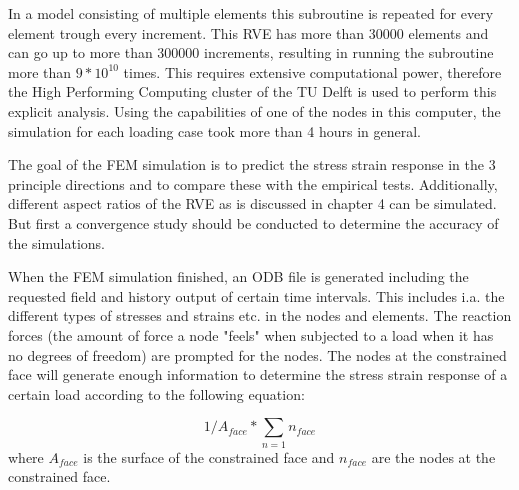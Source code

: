 In a model consisting of multiple elements this subroutine is repeated for every element trough every increment. This RVE has more than 30000 elements and can go up to more than 300000 increments, resulting in running the subroutine more than $9*10^{10}$ times. This requires extensive computational power, therefore the High Performing Computing cluster of the TU Delft is used to perform this explicit analysis. Using the capabilities of one of the nodes in this computer, the simulation for each loading case took more than 4 hours in general.

The goal of the FEM simulation is to predict the stress strain response in the 3 principle directions and to compare these with the empirical tests. Additionally, different aspect ratios of the RVE as is discussed in chapter 4 can be simulated. But first a convergence study should be conducted to determine the accuracy of the simulations.

When the FEM simulation finished, an ODB file is generated including the requested field and history output of certain time intervals. This includes i.a. the different types of stresses and strains etc. in the nodes and elements. The reaction forces (the amount of force a node "feels" when subjected to a load when it has no degrees of freedom) are prompted for the nodes. The nodes at the constrained face will generate enough information to determine the stress strain response of a certain load according to the following equation: 

\begin{equation} \label{eqn:RVESS}
1/A_{face}*\sum_{n=1} n_{face}
\end{equation}where $A_{face}$ is the surface of the constrained face and $n_{face}$ are the nodes at the constrained face. 

